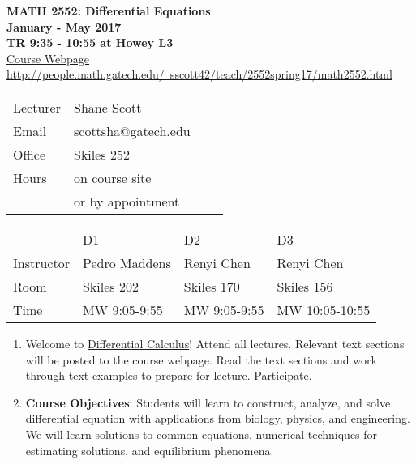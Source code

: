 \documentclass[12pt]{article}
\begin{document}
\begin{small}

\begin{center}
{\bf MATH 2552: Differential Equations  \\
 January -  May 2017\\
TR 9:35 - 10:55 at  Howey L3
}\\
\href{http://people.math.gatech.edu/~sscott42/teach/2552spring17/math2552.html}{Course Webpage}\\
\href{http://people.math.gatech.edu/~sscott42/teach/2552spring17/math2552.html}{http://people.math.gatech.edu/~sscott42/teach/2552spring17/math2552.html}
\end{center}


\begin{tabular}{l l l l}
Lecturer & Shane Scott &  & \\
Email & scottsha@gatech.edu &  &  \\
Office & Skiles 252 &  &  \\
Hours & on course site  & & \\
& or by appointment&&
\end{tabular}

\vspace{.25cm}
\begin{tabular}{l l l l}
 &D1 & D2&  D3\\
Instructor & Pedro Maddens & Renyi Chen &  Renyi Chen\\
Room & Skiles 202 & Skiles 170 & Skiles 156 \\
Time & MW 9:05-9:55& MW 9:05-9:55 & MW 10:05-10:55
\end{tabular}

\begin{enumerate}[]

\item Welcome to \href{http://www.math.gatech.edu/course/math/2552}{Differential Calculus}! Attend all lectures.
Relevant text sections will be posted to the course webpage.
Read the text sections and work through text examples to prepare for lecture.
Participate. 

\item  \textbf{Course Objectives}: 
Students will learn to construct, analyze, and solve differential equation with applications from biology, physics, and engineering.
We will learn solutions to common equations, numerical techniques for estimating solutions, and equilibrium phenomena.


\end{enumerate}
\end{small}
\end{document}
